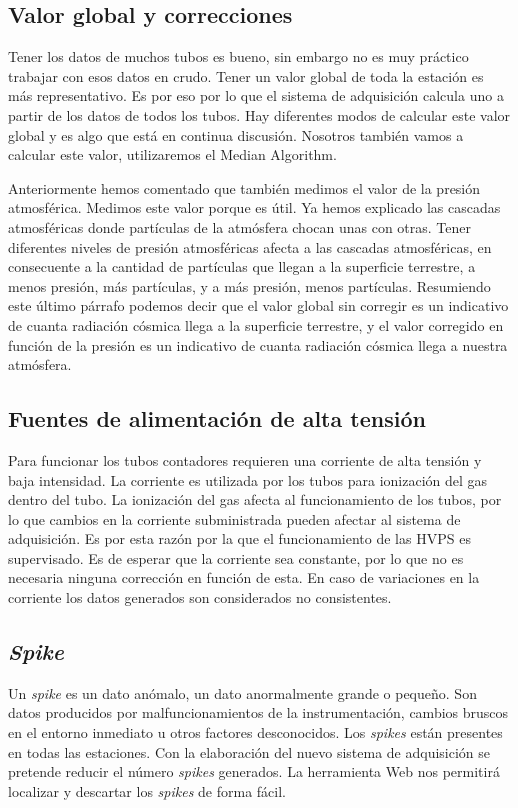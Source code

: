 	\subsection{Valor global y correcciones}
		Tener los datos de muchos tubos es bueno, sin embargo no es muy práctico trabajar con esos datos en crudo. Tener un valor global de
		toda la estación es más representativo. Es por eso por lo que el sistema de adquisición calcula uno a partir de los datos de todos los
		tubos. Hay diferentes modos de calcular este valor global y es algo que está en continua discusión. Nosotros también vamos a calcular
		este valor, utilizaremos el Median Algorithm\cite{MedianAlgr}.
		\par
		Anteriormente hemos comentado que también medimos el valor de la presión atmosférica. Medimos este valor porque es útil. Ya hemos
		explicado las cascadas atmosféricas donde partículas de la atmósfera chocan unas con otras. Tener diferentes niveles de presión
		atmosféricas afecta a las cascadas atmosféricas, en consecuente a la cantidad de partículas que llegan a la superficie terrestre, a
		menos presión, más partículas, y a más presión, menos partículas. Resumiendo este último párrafo  podemos decir que el valor global
		sin corregir es un indicativo de cuanta radiación cósmica llega a la superficie terrestre, y el valor corregido en función de la
		presión es un indicativo de cuanta radiación cósmica llega a nuestra atmósfera.
	\subsection{Fuentes de alimentación de alta tensión}
		Para funcionar los tubos contadores requieren una corriente de alta tensión y baja intensidad. La corriente es utilizada por los tubos
		para ionización del gas dentro del tubo. La ionización del gas afecta al funcionamiento de los tubos, por lo que cambios en la
		corriente subministrada pueden afectar al sistema de adquisición. Es por esta razón por la que el funcionamiento de las HVPS es
		supervisado. Es de esperar que la corriente sea constante, por lo que no es necesaria ninguna corrección en función de esta. En caso
		de variaciones en la corriente los datos generados son considerados no consistentes.
	\subsection{\emph{Spike}}
		Un \emph{spike} es un dato anómalo, un dato anormalmente grande o pequeño. Son datos producidos por malfuncionamientos de la
		instrumentación, cambios bruscos en el entorno inmediato u otros factores desconocidos. Los \emph{spikes} están presentes en todas las
		estaciones. Con la elaboración del nuevo sistema de adquisición se pretende reducir el número \emph{spikes} generados. La herramienta
		Web nos permitirá localizar y descartar los \emph{spikes} de forma fácil.  
